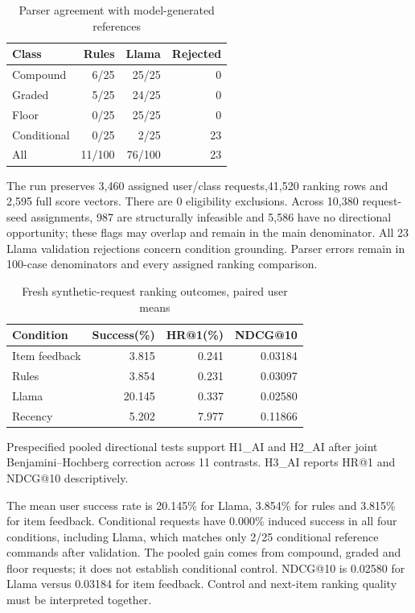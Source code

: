 \documentclass[conference]{IEEEtran}
\begin{document}
\begin{table}[t]\centering\small
\caption{Parser agreement with model-generated references}\label{tab:aiparser}
\begin{tabular}{lrrr}\toprule
Class & Rules & Llama & Rejected\\\midrule
Compound & 6/25 & 25/25 & 0\\
Graded & 5/25 & 24/25 & 0\\
Floor & 0/25 & 25/25 & 0\\
Conditional & 0/25 & 2/25 & 23\\
All & 11/100 & 76/100 & 23\\\bottomrule
\end{tabular}\end{table}

The run preserves 3,460 assigned user/class requests,41,520 ranking rows and 2,595 full score vectors. There are 0 eligibility exclusions. Across 10,380 request-seed assignments, 987 are structurally infeasible and 5,586 have no directional opportunity; these flags may overlap and remain in the main denominator. All 23 Llama validation rejections concern condition grounding. Parser errors remain in 100-case denominators and every assigned ranking comparison.

\begin{table}[t]\centering\small
\caption{Fresh synthetic-request ranking outcomes, paired user means}\label{tab:airank}
\begin{tabular}{lrrr}\toprule
Condition & Success(\%) & HR@1(\%) & NDCG@10\\\midrule
Item feedback & 3.815 & 0.241 & 0.03184\\
Rules & 3.854 & 0.231 & 0.03097\\
Llama & 20.145 & 0.337 & 0.02580\\
Recency & 5.202 & 7.977 & 0.11866\\
\bottomrule
\end{tabular}\end{table}

Prespecified pooled directional tests support H1\_AI and H2\_AI after joint Benjamini--Hochberg correction across 11 contrasts. H3\_AI reports HR@1 and NDCG@10 descriptively.

The mean user success rate is 20.145\% for Llama, 3.854\% for rules and 3.815\% for item feedback. Conditional requests have 0.000\% induced success in all four conditions, including Llama, which matches only 2/25 conditional reference commands after validation. The pooled gain comes from compound, graded and floor requests; it does not establish conditional control. NDCG@10 is 0.02580 for Llama versus 0.03184 for item feedback. Control and next-item ranking quality must be interpreted together.
\end{document}
